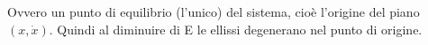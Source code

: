 \documentclass[Main.tex]{subfiles}
\begin{document}
\begin{tema}
\begin{itemize}
Ovvero un punto di equilibrio (l'unico) del sistema, cioè l'origine del piano $(x,\dot x).$ Quindi al diminuire di E le ellissi degenerano nel punto di origine.
\end{itemize}

\begin{comment}
In modo alternativo si può scrivere l'energia nella forma:
\begin{equation}
	\frac{\mu \dot r^2}{2} + \frac{\ell_z^2}{2 \mu r^2}-\frac{k}{r}
\end{equation}

Il potenziale efficace è della forma:
\begin{equation}
	U'_e(r)= - \frac{\ell_z^2}{\mu r^3} +kr =0 \Rightarrow r_c = \left( \frac{\ell_z^2}{\mu k }\right)^\frac{1}{4} = \frac{ |\ell_z|^\frac{1}{2}}{\left( \mu k \right)^\frac{1}{4}}
\end{equation}
L'energia minima invece si trova cercando il minimo di $U_e(r)$
\begin{equation}
	E_{min}= \min_{r>0} U_e(r) = U_e(r_c) = \frac{\ell_z^2 \sqrt{\mu k}}{2 \mu |\ell_z|} + \frac{1}{2} k \frac{|\ell_z|}{\sqrt{\mu k}} = r_c^2 = \frac{|\ell_z|}{\sqrt{\mu k}}= \sqrt{\frac{k}{\mu}} | \ell_z|
\end{equation}
\end{comment}
\end{tema}
\end{document}
